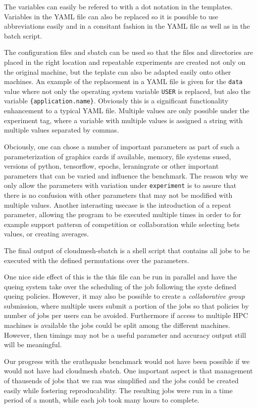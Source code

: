 \documentclass[utf8]{FrontiersinVancouver} %
\begin{document}
The variables can easily be refered to with a dot notation in the
templates.  Variables in the YAML file can also be replaced so it is
possible to use abbreviations easily and in a consitant fashion in the
YAML file as well as in the batch script.

The configuration files and sbatch can be used so that the files and
directories are placed in the right location and repeatable
experiments are created not only on the original machine, but the
teplate can also be adapted easily onto other machines. An example of
the replacement in a YAML file is given for the \verb|data| value
where not only the operating system variable \verb|USER| is replaced,
but also the variable \verb|{application.name}|. Obviously this is a
significant functionality enhancement to a typical YAML file.
Multiple values are only possible under the experiment tag, where a
variable with multiple values is assigned a string with multiple
values separated by commas.

Obciously, one can chose a number of important parameters as part of
such a parameterization of graphics cards if available, memory, file
systems sused, versions of python, tensorflow, epochs, leraningrate or
other important parameters that can be varied and influence the
benchmark.  The reason why we only allow the parameters with variation
under \verb|experiment| is to assure that there is no confusion with
other parameters that may not be modified with multiple values.
Another interasting usecase is the introduction of a repeat parameter,
allowing the program to be executed multiple times in order to for
example support pattersn of competition or collaboration while
selecting bets values, or creating averages.

The final output of cloudmesh-sbatch is a shell script that contains
all jobs to be executed with the defined permutations over the
parameters.

One nice side effect of this is the this file can be run in parallel
and have the queing system take over the scheduling of the job
following the syste defined queing policies. However, it may also be
possible to create a {\it collaborative group} submission, where
multiple users submit a portion of the jobs so that policies by number
of jobs per users can be avoided. Furthermore if access to multiple
HPC machines is available the jobs could be split among the different
machines. However, then timings may not be a useful parameter and
accuracy output still will be meaningful.

Our progress with the erathquake benchmark would not have been
possible if we would not have had cloudmesh sbatch. One important
aspect is that management of thausends of jobs that we ran was
simplified and the jobs could be created easily while fostering
reproducability. The resulting jobs were run in a time period of
a month, while each job took many hours to complete. 
\end{document}
